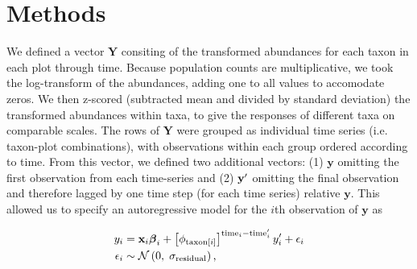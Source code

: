 

\section*{Methods}

We defined a vector $\mathbf{Y}$ consiting of the transformed abundances for each taxon
in each plot through time.
Because population counts are multiplicative, we took the log-transform of the abundances,
adding one to all values to accomodate zeros.
We then z-scored (subtracted mean and divided by standard deviation) the transformed
abundances within taxa, to give the responses of different taxa on comparable scales.
The rows of $\mathbf{Y}$ were grouped as individual time series (i.e. taxon-plot
combinations), with observations within each group ordered according to time.
From this vector, we defined two additional vectors:
(1) $\mathbf{y}$ omitting the first observation from each time-series and
(2) $\mathbf{y\sp{\prime}}$ omitting the final observation
and therefore lagged by one time step (for each time series) relative $\mathbf{y}$.
This allowed us to specify an autoregressive model for the $i$th observation of
$\mathbf{y}$ as

\begin{equation} \label{eq:y-i}
\begin{split}
    y_i &= \mathbf{x}_i {\boldsymbol\beta}_i +
        \left[ \phi_{\text{taxon}[i]} \right]^{\text{time}_i - \text{time}\sp{\prime}_i}
        y\sp{\prime}_i + \epsilon_i \\
    \epsilon_i &\sim \mathcal{N} \left(0, \; \sigma_{\text{residual}} \right)
    \text{,}
\end{split}
\end{equation}

